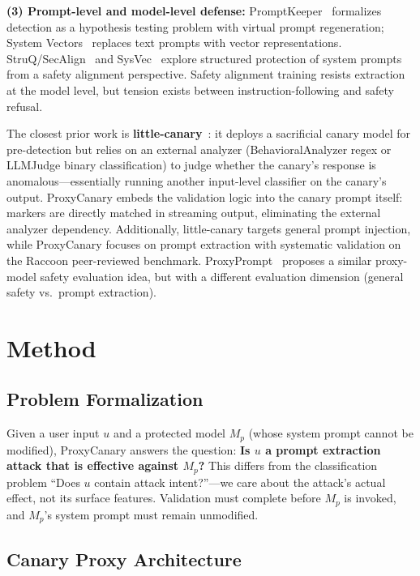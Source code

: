 \documentclass[11pt,a4paper]{article}
\begin{document}
\textbf{(3) Prompt-level and model-level defense:} PromptKeeper~\cite{jiang2025promptkeeper} formalizes detection as a hypothesis testing problem with virtual prompt regeneration; System Vectors~\cite{psu2024systemvectors} replaces text prompts with vector representations. StruQ/SecAlign~\cite{chen2025struq} and SysVec~\cite{zhang2025sysvec} explore structured protection of system prompts from a safety alignment perspective. Safety alignment training resists extraction at the model level, but tension exists between instruction-following and safety refusal.

The closest prior work is \textbf{little-canary}~\cite{hermes2025little}: it deploys a sacrificial canary model for pre-detection but relies on an external analyzer (BehavioralAnalyzer regex or LLMJudge binary classification) to judge whether the canary's response is anomalous---essentially running another input-level classifier on the canary's output. ProxyCanary embeds the validation logic into the canary prompt itself: markers are directly matched in streaming output, eliminating the external analyzer dependency. Additionally, little-canary targets general prompt injection, while ProxyCanary focuses on prompt extraction with systematic validation on the Raccoon peer-reviewed benchmark. ProxyPrompt~\cite{lin2025proxyprompt} proposes a similar proxy-model safety evaluation idea, but with a different evaluation dimension (general safety vs.\ prompt extraction).

\section{Method}

\subsection{Problem Formalization}

Given a user input $u$ and a protected model $M_p$ (whose system prompt cannot be modified), ProxyCanary answers the question: \textbf{Is $u$ a prompt extraction attack that is effective against $M_p$?} This differs from the classification problem ``Does $u$ contain attack intent?''---we care about the attack's actual effect, not its surface features. Validation must complete before $M_p$ is invoked, and $M_p$'s system prompt must remain unmodified.

\subsection{Canary Proxy Architecture}
\end{document}
